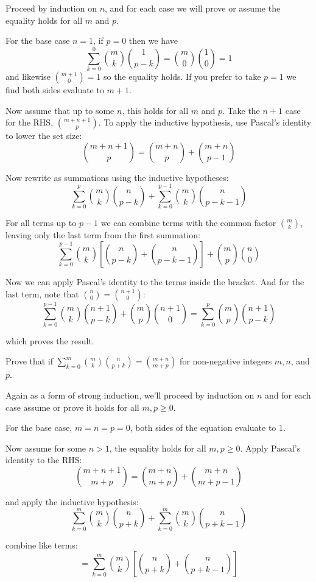 \documentclass{article}
\begin{document}
Proceed by induction on $n$, and for each case we will prove or assume the equality holds for all $m$ and $p$.

For the base case $n = 1$, if $p = 0$ then we have
$$\sum_{k=0}^0 \binom{m}{k}\binom{1}{p-k} = \binom{m}{0}\binom{1}{0} = 1$$
and likewise $\binom{m + 1}{0} = 1$ so the equality holds. If you prefer to take $p = 1$ we find both sides evaluate to $m + 1$.

Now assume that up to some $n$, this holds for all $m$ and $p$. Take the $n+1$ case for the RHS, $\binom{m+n+1}{p}$. To apply the inductive hypothesis, use Pascal's identity to lower the set size:
$$\binom{m+n+1}{p} = \binom{m+n}{p} + \binom{m+n}{p-1}$$

Now rewrite as summations using the inductive hypotheses:
$$\sum_{k=0}^p \binom{m}{k}\binom{n}{p-k} + \sum_{k=0}^{p-1}\binom{m}{k}\binom{n}{p-k-1}$$

For all terms up to $p - 1$ we can combine terms with the common factor $\binom{m}{k}$, leaving only the last term from the first summation:
$$\sum_{k=0}^{p-1}\binom{m}{k}\left[\binom{n}{p-k} + \binom{n}{p-k-1}\right] + \binom{m}{p}\binom{n}{0}$$

Now we can apply Pascal's identity to the terms inside the bracket. And for the last term, note that $\binom{n}{0} = \binom{n+1}{0}$:
$$\sum_{k=0}^{p-1} \binom{m}{k}\binom{n+1}{p-k} + \binom{m}{p}\binom{n+1}{0} = \sum_{k=0}^{p}\binom{m}{p}\binom{n+1}{p-k}$$

which proves the result.

\begin{problem}
Prove that if $\sum\limits_{k=0}^m \binom{m}{k}\binom{n}{p+k} = \binom{m+n}{m+p}$ for non-negative integers $m, n$, and $p$.
\end{problem}

Again as a form of strong induction, we'll proceed by induction on $n$ and for each case assume or prove it holds for all $m, p \geq 0$.

For the base case, $m = n = p = 0$, both sides of the equation evaluate to 1.

Now assume for some $n > 1$, the equality holds for all $m, p \geq 0$. Apply Pascal's identity to the RHS:
$$\binom{m+n+1}{m+p} = \binom{m+n}{m+p} + \binom{m+n}{m+p-1}$$

and apply the inductive hypothesis:
$$\sum_{k=0}^m \binom{m}{k}\binom{n}{p+k} + \sum_{k=0}^{m}\binom{m}{k}\binom{n}{p+k-1}$$

combine like terms:
$$= \sum_{k=0}^{m}\binom{m}{k}\left[\binom{n}{p+k} + \binom{n}{p+k-1}\right]$$
\end{document}
